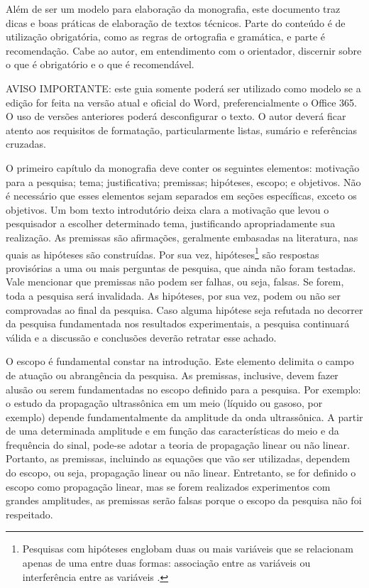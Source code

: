 Além de ser um modelo para elaboração da monografia, este documento traz dicas e boas práticas de elaboração de textos técnicos. Parte do conteúdo é de utilização obrigatória, como as regras de ortografia e gramática, e parte é recomendação. Cabe ao autor, em entendimento com o orientador, discernir sobre o que é obrigatório e o que é recomendável.

AVISO IMPORTANTE: este guia somente poderá ser utilizado como modelo se a edição for feita na versão atual e oficial do Word, preferencialmente o Office 365. O uso de versões anteriores poderá desconfigurar o texto. O autor deverá ficar atento aos requisitos de formatação, particularmente listas, sumário e referências cruzadas.

O primeiro capítulo da monografia deve conter os seguintes elementos: motivação para a pesquisa; tema; justificativa; premissas; hipóteses, escopo; e objetivos. Não é necessário que esses elementos sejam separados em seções específicas, exceto os objetivos. Um bom texto introdutório deixa clara a motivação que levou o pesquisador a escolher determinado tema, justificando apropriadamente sua realização. As premissas são afirmações, geralmente embasadas na literatura, nas quais as hipóteses são construídas. Por sua vez, hipóteses\footnote{Pesquisas com hipóteses englobam duas ou mais variáveis que se relacionam apenas de uma entre duas formas: associação entre as variáveis ou interferência entre as variáveis \cite{volpato_dicas_2010}. }  são respostas provisórias a uma ou mais perguntas de pesquisa, que ainda não foram testadas. Vale mencionar que premissas não podem ser falhas, ou seja, falsas. Se forem, toda a pesquisa será invalidada. As hipóteses, por sua vez, podem ou não ser comprovadas ao final da pesquisa. Caso alguma hipótese seja refutada no decorrer da pesquisa fundamentada nos resultados experimentais, a pesquisa continuará válida e a discussão e conclusões deverão retratar esse achado.

O escopo é fundamental constar na introdução. Este elemento delimita o campo de atuação ou abrangência da pesquisa. As premissas, inclusive, devem fazer alusão ou serem fundamentadas no escopo definido para a pesquisa. Por exemplo: o estudo da propagação ultrassônica em um meio (líquido ou gasoso, por exemplo) depende fundamentalmente da amplitude da onda ultrassônica. A partir de uma determinada amplitude e em função das características do meio e da frequência do sinal, pode-se adotar a teoria de propagação linear ou não linear. Portanto, as premissas, incluindo as equações que vão ser utilizadas, dependem do escopo, ou seja, propagação linear ou não linear. Entretanto, se for definido o escopo como propagação linear, mas se forem realizados experimentos com grandes amplitudes, as premissas serão falsas porque o escopo da pesquisa não foi respeitado.

